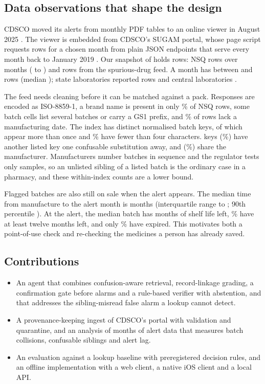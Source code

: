 \subsection{Data observations that shape the design}
\label{sec:data}
CDSCO moved its alerts from monthly PDF tables to an online viewer in August 2025 \cite{cdsco2025nsqlink,cdsco2026nsqpage}. The viewer is embedded from CDSCO's SUGAM portal, whose page script requests rows for a chosen month from plain JSON endpoints that serve every month back to January 2019 \cite{cdsco2026portal}. Our snapshot of \SnapshotDate{} holds \NumAlertRows{} rows: \NumNsqRows{} NSQ rows over \NumMonths{} months (\FirstMonth{} to \LastMonth{}) and \NumSpuriousTabRows{} rows from the spurious-drug feed. A month has between \RowsPerMonthMin{} and \RowsPerMonthMax{} rows (median \RowsPerMonthMedian{}); state laboratories reported \RowsStateLabs{} rows and central laboratories \RowsCentralLabs{}.

The feed needs cleaning before it can be matched against a pack. Responses are encoded as ISO-8859-1, a brand name is present in only \BrandPresentPct\% of NSQ rows, some batch cells list several batches or carry a GS1 prefix, and \MissingDatePct\% of rows lack a manufacturing date. The index has \DistinctKeys{} distinct normalised batch keys, of which \RepeatedKeys{} appear more than once and \ShortKeyPct\% have fewer than four characters. \NeighbourKeys{} keys (\NeighbourKeysPct\%) have another listed key one confusable substitution away, and \SiblingKeys{} (\SiblingKeysPct\%) share the manufacturer. Manufacturers number batches in sequence and the regulator tests only samples, so an unlisted sibling of a listed batch is the ordinary case in a pharmacy, and these within-index counts are a lower bound.

Flagged batches are also still on sale when the alert appears. The median time from manufacture to the alert month is \LagMedian{} months (interquartile range \LagQOne{} to \LagQThree{}; 90th percentile \LagPNinety{}). At the alert, the median batch has \ShelfMedian{} months of shelf life left, \ShelfTwelvePlusPct\% have at least twelve months left, and only \ExpiredAtAlertPct\% have expired. This motivates both a point-of-use check and re-checking the medicines a person has already saved.

\subsection{Contributions}
\begin{itemize}
\item An agent that combines confusion-aware retrieval, record-linkage grading, a confirmation gate before alarms and a rule-based verifier with abstention, and that addresses the sibling-misread false alarm a lookup cannot detect.
\item A provenance-keeping ingest of CDSCO's portal with validation and quarantine, and an analysis of \NumMonths{} months of alert data that measures batch collisions, confusable siblings and alert lag.
\item An evaluation against a lookup baseline with preregistered decision rules, and an offline implementation with a web client, a native iOS client and a local API.
\end{itemize}
